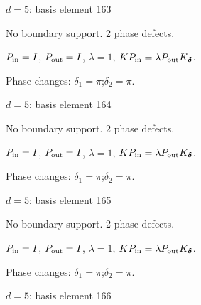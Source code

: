 \vfill
{\footnotesize\texttt{}}
\newpage
{}
{\Large $d=5$: basis element 163}\par
No boundary support. 2 phase defects.
\begin{center}
\end{center}
\vspace{-1mm}
$P_{\rm in}=I$, \quad $P_{\rm out}=I$, \quad $\lambda=1$, \qquad $K P_{\rm in}=\lambda P_{\rm out}K_{\boldsymbol\delta}$.
\par\smallskip\begin{minipage}{.98\linewidth}\small Phase changes: $\delta_{1}=\pi$;\quad $\delta_{2}=\pi$.\end{minipage}
\vfill
{\footnotesize\texttt{}}
\newpage
{}
{\Large $d=5$: basis element 164}\par
No boundary support. 2 phase defects.
\begin{center}
\end{center}
\vspace{-1mm}
$P_{\rm in}=I$, \quad $P_{\rm out}=I$, \quad $\lambda=1$, \qquad $K P_{\rm in}=\lambda P_{\rm out}K_{\boldsymbol\delta}$.
\par\smallskip\begin{minipage}{.98\linewidth}\small Phase changes: $\delta_{1}=\pi$;\quad $\delta_{2}=\pi$.\end{minipage}
\vfill
{\footnotesize\texttt{}}
\newpage
{}
{\Large $d=5$: basis element 165}\par
No boundary support. 2 phase defects.
\begin{center}
\end{center}
\vspace{-1mm}
$P_{\rm in}=I$, \quad $P_{\rm out}=I$, \quad $\lambda=1$, \qquad $K P_{\rm in}=\lambda P_{\rm out}K_{\boldsymbol\delta}$.
\par\smallskip\begin{minipage}{.98\linewidth}\small Phase changes: $\delta_{1}=\pi$;\quad $\delta_{2}=\pi$.\end{minipage}
\vfill
{\footnotesize\texttt{}}
\newpage
{}
{\Large $d=5$: basis element 166}\par
